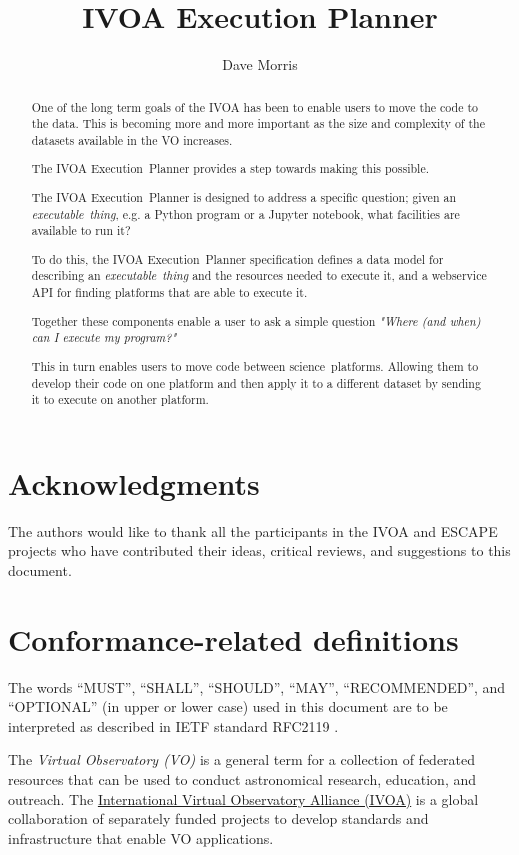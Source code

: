 \documentclass[11pt,a4paper]{ivoa}
\title{IVOA Execution Planner}
\author[http://www.ivoa.net/twiki/bin/view/IVOA/DaveMorris]
       {Dave Morris}
\newcommand{\webservice} {webservice}
\newcommand{\ivoa} {IVOA}
\newcommand{\executionplanner} {Execution~Planner}
\newcommand{\jupyter} {Jupyter}
\newcommand{\python} {Python}
\newcommand{\footurl}[1] {\footnote{\url{#1}}}
\newcommand{\dataset} {dataset}
\newcommand{\scienceplatform} {science~platform}
\newcommand{\executablething}  {\textit{executable~thing}}
\begin{document}
\begin{abstract}

One of the long term goals of the IVOA has been to enable users to
move the code to the data.
This is becoming more and more important as the size and complexity
of the \dataset{}s available in the VO increases.

The \ivoa{} \executionplanner{} provides a step towards making this possible.

The \ivoa{} \executionplanner{} is designed to address a specific question;
given an \executablething{}, e.g. a \python{} program or a \jupyter{} notebook,
what facilities are available to run it?

To do this, the \ivoa{} \executionplanner{} specification defines
a data model for describing an \executablething{}
and the resources needed to execute it,
and a \webservice{} API for finding platforms
that are able to execute it.

Together these components enable a user to ask a simple question
\textit{"Where (and when) can I execute my program?"}

This in turn enables users to move code between \scienceplatform{}s.
Allowing them to develop their code on one platform and then apply it to a different
\dataset{} by sending it to execute on another platform.

\end{abstract}

\section*{Acknowledgments}

The authors would like to thank all the participants in the IVOA and ESCAPE projects
who have contributed their ideas, critical reviews, and suggestions to this document.

\section*{Conformance-related definitions}

The words ``MUST'', ``SHALL'', ``SHOULD'', ``MAY'', ``RECOMMENDED'', and
``OPTIONAL'' (in upper or lower case) used in this document are to be
interpreted as described in IETF standard RFC2119 \citep{std:RFC2119}.

The \emph{Virtual Observatory (VO)} is a general term for a collection of
federated resources that can be used to conduct astronomical research,
education, and outreach.
The \href{https://www.ivoa.net}{International Virtual Observatory Alliance (IVOA)}
is a global collaboration of separately funded projects to develop standards and
infrastructure that enable VO applications.
\end{document}
